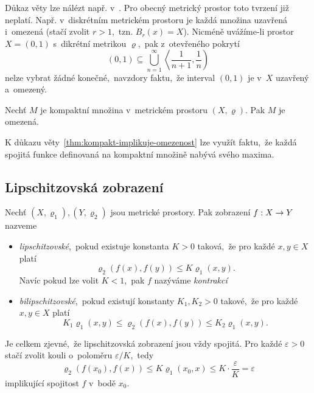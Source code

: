 Důkaz věty lze nálézt např. v~\citep[str. 166]{NetukaAnalyza2014}. Pro obecný metrický prostor toto tvrzení již neplatí. Např. v~diskrétním metrickém prostoru je každá množina uzavřená i~omezená (stačí zvolit $r>1$,~tzn. $B_r(x)=X$). Nicméně uvážíme-li prostor $X=(0,1)$ s~dikrétní metrikou $\varrho$,~pak z~otevřeného pokrytí
\[(0,1)\subseteq\bigcup_{n=1}^\infty\left\langle\dfrac{1}{n+1},\dfrac{1}{n}\right)\]
nelze vybrat žádné konečné,~navzdory faktu,~že interval $(0,1)$ je v~$X$ uzavřený a~omezený.
\begin{theorem}\label{thm:kompakt-implikuje-omezenost}
    Nechť $M$ je kompaktní množina v~metrickém prostoru $(X,\varrho)$. Pak $M$ je omezená.
\end{theorem}
K důkazu věty~\ref{thm:kompakt-implikuje-omezenost} lze využít faktu,~že každá spojitá funkce definovaná na kompaktní množině nabývá svého maxima.

\subsection{Lipschitzovská zobrazení}\label{subsec:lipschitzovska-zobrazeni}

\begin{definition}\label{def:bilipschitzovske-zobrazeni}
    Nechť $(X,\varrho_1),(Y,\varrho_2)$ jsou metrické prostory. Pak zobrazení $f:X \rightarrow Y$ nazveme 
    \begin{itemize}
        \item \emph{lipschitzovské},~pokud existuje konstanta $K>0$ taková,~že pro každé $x,y\in X$ platí
        \[\varrho_2(f(x),f(y))\leqslant K\varrho_1(x,y).\]
        Navíc pokud lze volit $K<1$,~pak $f$ nazýváme \emph{kontrakcí}
        \item \emph{bilipschitzovské},~pokud existují konstanty $K_1,K_2>0$ takové,~že pro každé $x,y\in X$ platí
        \[K_1\varrho_1(x,y)\leqslant\varrho_2(f(x),f(y))\leqslant K_2\varrho_1(x,y).\]
    \end{itemize}
\end{definition}
Je celkem zjevné,~že lipschitzovská zobrazení jsou vždy spojitá. Pro každé $\varepsilon>0$ stačí zvolit kouli o~poloměru $\varepsilon/K$,~tedy
\[\varrho_2(f(x_0),f(x))\leqslant K\varrho_1(x_0,x)\leqslant K\cdot\dfrac{\varepsilon}{K}=\varepsilon\]
implikující spojitost $f$ v~bodě $x_0$.